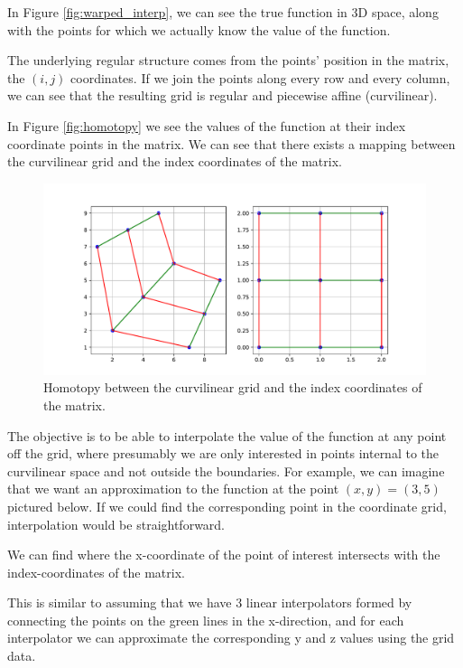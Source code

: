\documentclass[\econtexRoot/SequentialEGM]{subfiles}
\begin{document}
In Figure \ref{fig:warped_interp}, we can see the true function in 3D space, along with the points for which we actually know the value of the function.

The underlying regular structure comes from the points' position in the matrix, the $(i,j)$ coordinates. If we join the points along every row and every column, we can see that the resulting grid is regular and piecewise affine (curvilinear).

In Figure \ref{fig:homotopy} we see the values of the function at their index coordinate points in the matrix. We can see that there exists a mapping between the curvilinear grid and the index coordinates of the matrix.

\begin{figure}
    \centering
    \includegraphics[width=0.8\linewidth]{Figures/Homotopy.pdf}
    \caption{Homotopy between the curvilinear grid and the index coordinates of the matrix.}
    \notinsubfile{\label{fig:homotopy}}
\end{figure}

The objective is to be able to interpolate the value of the function at any point off the grid, where presumably we are only interested in points internal to the curvilinear space and not outside the boundaries. For example, we can imagine that we want an approximation to the function at the point $(x,y) = (3, 5)$ pictured below. If we could find the corresponding point in the coordinate grid, interpolation would be straightforward.

We can find where the x-coordinate of the point of interest intersects with the index-coordinates of the matrix.

This is similar to assuming that we have 3 linear interpolators formed by connecting the points on the green lines in the x-direction, and for each interpolator we can approximate the corresponding y and z values using the grid data.
\end{document}
